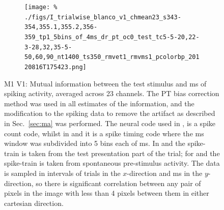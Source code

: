\begin{figure}[htbp]
\begin{subfigure}[b]{0.5\linewidth}
        \label{fig:b1-5x4tp1}
        \texttt{[image: \%
./figs/I\_trialwise\_blanco\_v1\_chmean23\_s343-354,355.1,355.2,356-359\_tp1\_5bins\_of\_4ms\_dr\_pt\_oc0\_test\_tc5-5-20,22-3-28,32,35-5-50,60,90\_nt1400\_ts350\_rmvet1\_rmvms1\_pcolorbp\_20120816T175423.png]}
    \end{subfigure}
    \caption{\small{}M1 V1: Mutual information between the test stimulus and \unit[20]{ms} of spiking activity, averaged across 23 channels.
The PT bias correction method was used in all estimates of the information, and the modification to the spiking data to remove the artifact as described in Sec.~\ref{sec:ma} was performed.
The neural code used in ,  is a spike count code, whilst in  and  it is a spike timing code where the \unit[20]{ms} window was subdivided into 5 bins each of \unit[4]{ms}.
In  and  the spike-train is taken from the test presentation part of the trial;
for  and  the spike-train is taken from spontaneous pre-stimulus activity.
The data is sampled in intervals of \unit[350]{trials} in the $x$-direction and \unit[5]{ms} in the $y$-direction, so there is significant correlation between any pair of pixels in the image with less than 4 pixels between them in either cartesian direction.
}
    \label{fig:b1-trialwise}
\end{figure}



